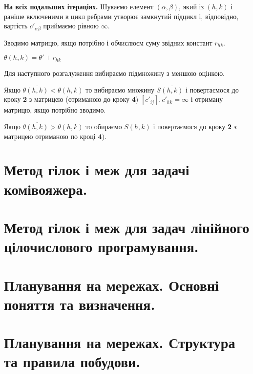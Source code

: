 \documentclass[12pt,a4paper]{report}
\newenvironment{slim_enumerate}{
\begin{enumerate}
  \setlength{\itemsep}{1pt}
  \setlength{\parskip}{0pt}
  \setlength{\parsep}{0pt}}
{\end{enumerate}}
\begin{document}
\begin{slim_enumerate}
\begin{slim_enumerate}
\begin{slim_enumerate}
{\bf На всіх подальших ітераціях.} Шукаємо елемент $(\alpha, \beta)$, який із $(h,k)$ і раніше включеними в цикл ребрами утворює замкнутий підцикл і, відповідно, вартість $c'_{\alpha \beta}$ приймаємо рівною $\infty$.

      \item Зводимо матрицю, якщо потрібно і обчислюєм суму звідних констант $r_{h k}$.
      \item $ \theta(h,k) = \theta' + r_{h k} $
    \end{slim_enumerate}
  \end{slim_enumerate}
  \item Для наступного розгалуження вибираємо підмножину з меншою оцінкою.
  \begin{slim_enumerate}
    \item Якщо $\theta\overline{(h,k)} < \theta(h,k)$ то вибираємо множину $S\overline{(h,k)}$ і повертаємося до кроку {\bf 2} з матрицею (отриманою до кроку {\bf 4}) $[c'_{ij}], c'_{h k}=\infty$ і отриману матрицю, якщо потрібно зводимо.
    \item Якщо $\theta\overline{(h,k)} > \theta(h,k)$ то обираємо $S(h,k)$ і повертаємося до кроку {\bf 2} з матрицею отриманою по кроці {\bf 4}).
  \end{slim_enumerate}
\end{slim_enumerate}

\clearpage

\chapter{Метод гілок і меж для задачі комівояжера.}

\clearpage

\chapter{Метод гілок і меж для задач лінійного цілочислового програмування.}

\clearpage


\chapter{Планування на мережах. Основні поняття та визначення.}

\clearpage

\chapter{Планування на мережах. Структура та правила побудови.}
\end{document}
